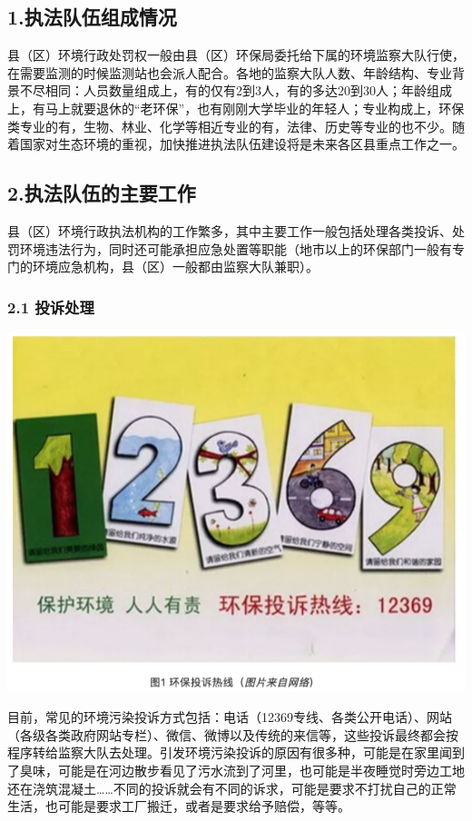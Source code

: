 \documentclass[]{book}
\begin{document}
\subsection{1.执法队伍组成情况}

县（区）环境行政处罚权一般由县（区）环保局委托给下属的环境监察大队行使，在需要监测的时候监测站也会派人配合。各地的监察大队人数、年龄结构、专业背景不尽相同：人员数量组成上，有的仅有2到3人，有的多达20到30人；年龄组成上，有马上就要退休的``老环保''，也有刚刚大学毕业的年轻人；专业构成上，环保类专业的有，生物、林业、化学等相近专业的有，法律、历史等专业的也不少。随着国家对生态环境的重视，加快推进执法队伍建设将是未来各区县重点工作之一。

\subsection{2.执法队伍的主要工作}

县（区）环境行政执法机构的工作繁多，其中主要工作一般包括处理各类投诉、处罚环境违法行为，同时还可能承担应急处置等职能（地市以上的环保部门一般有专门的环境应急机构，县（区）一般都由监察大队兼职）。

\subsubsection{2.1 投诉处理}

\includegraphics[width=8.33in]{images/hjzf1}

目前，常见的环境污染投诉方式包括：电话（12369专线、各类公开电话）、网站（各级各类政府网站专栏）、微信、微博以及传统的来信等，这些投诉最终都会按程序转给监察大队去处理。引发环境污染投诉的原因有很多种，可能是在家里闻到了臭味，可能是在河边散步看见了污水流到了河里，也可能是半夜睡觉时旁边工地还在浇筑混凝土\ldots{}\ldots{}不同的投诉就会有不同的诉求，可能是要求不打扰自己的正常生活，也可能是要求工厂搬迁，或者是要求给予赔偿，等等。
\end{document}
